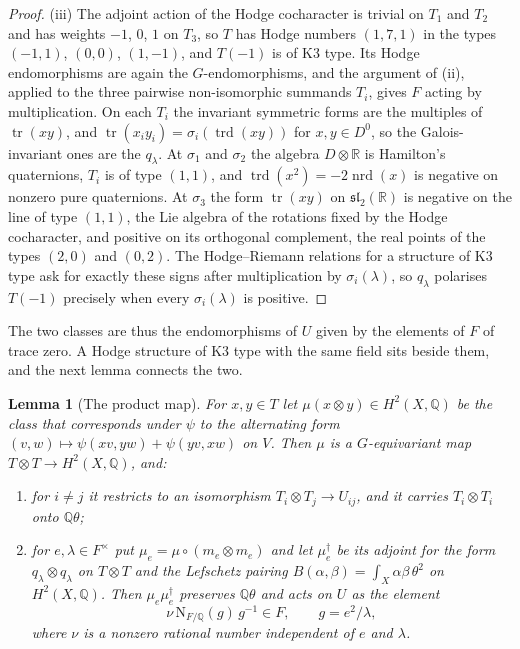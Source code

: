 \documentclass[11pt,reqno]{amsart}
\theoremstyle{plain}
\newtheorem{lemma}[theorem]{Lemma}
\theoremstyle{definition}
\theoremstyle{remark}
\newcommand{\QQ}{\mathbb{Q}}
\newcommand{\RR}{\mathbb{R}}
\newcommand{\Nm}{\mathrm{N}}             %
\begin{document}
\begin{proof}
(iii) The adjoint action of the Hodge cocharacter is trivial on $T_{1}$ and
$T_{2}$ and has weights $-1$, $0$, $1$ on $T_{3}$, so $T$ has Hodge numbers
$(1,7,1)$ in the types $(-1,1)$, $(0,0)$, $(1,-1)$, and $T(-1)$ is of K3
type. Its Hodge endomorphisms are again the $G$-endomorphisms, and the
argument of (ii), applied to the three pairwise non-isomorphic summands
$T_{i}$, gives $F$ acting by multiplication. On each $T_{i}$ the invariant
symmetric forms are the multiples of $\operatorname{tr}(xy)$, and
$\operatorname{tr}(x_{i}y_{i})=\sigma_{i}(\operatorname{trd}(xy))$ for
$x,y\in D^{0}$, so the Galois-invariant ones are the $q_{\lambda}$. At
$\sigma_{1}$ and $\sigma_{2}$ the algebra $D\otimes\RR$ is Hamilton's
quaternions, $T_{i}$ is of type $(1,1)$, and
$\operatorname{trd}(x^{2})=-2\operatorname{nrd}(x)$ is negative on nonzero
pure quaternions. At $\sigma_{3}$ the form
$\operatorname{tr}(xy)$ on $\mathfrak{sl}_{2}(\RR)$ is negative on the line of
type $(1,1)$, the Lie algebra of the rotations fixed by the Hodge
cocharacter, and positive on its orthogonal complement, the real points of
the types $(2,0)$ and $(0,2)$. The Hodge--Riemann relations for a structure
of K3 type ask for exactly these signs after multiplication by
$\sigma_{i}(\lambda)$, so $q_{\lambda}$ polarises $T(-1)$ precisely when every
$\sigma_{i}(\lambda)$ is positive.
\end{proof}

The two classes are thus the endomorphisms of $U$ given by the elements of
$F$ of trace zero. A Hodge structure of K3 type with the same field sits
beside them, and the next lemma connects the two.

\begin{lemma}[The product map]\label{lem:mumfordmu}
For $x,y\in T$ let $\mu(x\otimes y)\in H^{2}(X,\QQ)$ be the class that
corresponds under $\psi$ to the alternating form
$(v,w)\mapsto\psi(xv,yw)+\psi(yv,xw)$ on $V$. Then $\mu$ is a $G$-equivariant
map $T\otimes T\to H^{2}(X,\QQ)$, and:
\begin{enumerate}[label=\textup{(\roman*)},nosep,leftmargin=2.6em]
\item for $i\ne j$ it restricts to an isomorphism $T_{i}\otimes T_{j}\to
  U_{ij}$, and it carries $T_{i}\otimes T_{i}$ onto $\QQ\theta$;
\item for $e,\lambda\in F^{\times}$ put $\mu_{e}=\mu\circ(m_{e}\otimes m_{e})$
  and let $\mu_{e}^{\dagger}$ be its adjoint for the form
  $q_{\lambda}\otimes q_{\lambda}$ on $T\otimes T$ and the Lefschetz pairing
  $B(\alpha,\beta)=\int_{X}\alpha\beta\,\theta^{2}$ on $H^{2}(X,\QQ)$. Then
  $\mu_{e}\mu_{e}^{\dagger}$ preserves $\QQ\theta$ and acts on $U$ as the
  element
  \[
    \nu\,\Nm_{F/\QQ}(g)\,g^{-1}\in F,\qquad g=e^{2}/\lambda,
  \]
  where $\nu$ is a nonzero rational number independent of $e$ and $\lambda$.
\end{enumerate}
\end{lemma}
\end{document}
